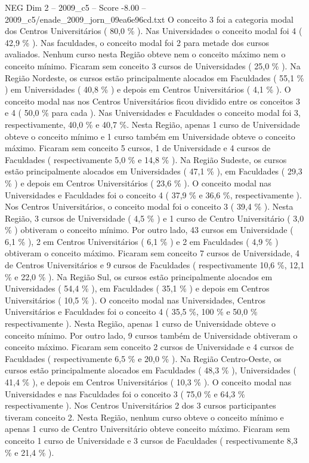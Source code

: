 \begin{textsample}{NEG Dim 2 – 2009\_c5 – Score -8.00 – 2009\_c5/enade\_2009\_jorn\_09ea6e96cd.txt}
O conceito 3 foi a categoria modal dos Centros Universitários ( 80,0 \% ).
Nas Universidades o conceito modal foi 4 ( 42,9 \% ).
Nas faculdades, o conceito modal foi 2 para metade dos cursos avaliados.
Nenhum curso nesta Região obteve nem o conceito máximo nem o conceito mínimo.
Ficaram sem conceito 3 cursos de Universidades ( 25,0 \% ).
Na Região Nordeste, os cursos estão principalmente alocados em Faculdades ( 55,1 \% ) em Universidades ( 40,8 \% ) e depois em Centros Universitários ( 4,1 \% ).
O conceito modal nas nos Centros Universitários ficou dividido entre os conceitos 3 e 4 ( 50,0 \% para cada ).
Nas Universidades e Faculdades o conceito modal foi 3, respectivamente, 40,0 \% e 40,7 \%.
Nesta Região, apenas 1 curso de Universidade obteve o conceito mínimo e 1 curso também em Universidade obteve o conceito máximo.
Ficaram sem conceito 5 cursos, 1 de Universidade e 4 cursos de Faculdades ( respectivamente 5,0 \% e 14,8 \% ).
Na Região Sudeste, os cursos estão principalmente alocados em Universidades ( 47,1 \% ), em Faculdades ( 29,3 \% ) e depois em Centros Universitários ( 23,6 \% ).
O conceito modal nas Universidades e Faculdades foi o conceito 4 ( 37,9 \% e 36,6 \%, respectivamente ).
Nos Centros Universitários, o conceito modal foi o conceito 3 ( 39,4 \% ).
Nesta Região, 3 cursos de Universidade ( 4,5 \% ) e 1 curso de Centro Universitário ( 3,0 \% ) obtiveram o conceito mínimo.
Por outro lado, 43 cursos em Universidade ( 6,1 \% ), 2 em Centros Universitários ( 6,1 \% ) e 2 em Faculdades ( 4,9 \% ) obtiveram o conceito máximo.
Ficaram sem conceito 7 cursos de Universidade, 4 de Centros Universitários e 9 cursos de Faculdades ( respectivamente 10,6 \%, 12,1 \% e 22,0 \% ).
Na Região Sul, os cursos estão principalmente alocados em Universidades ( 54,4 \% ), em Faculdades ( 35,1 \% ) e depois em Centros Universitários ( 10,5 \% ).
O conceito modal nas Universidades, Centros Universitários e Faculdades foi o conceito 4 ( 35,5 \%, 100 \% e 50,0 \% respectivamente ).
Nesta Região, apenas 1 curso de Universidade obteve o conceito mínimo.
Por outro lado, 9 cursos também de Universidade obtiveram o conceito máximo.
Ficaram sem conceito 2 cursos de Universidade e 4 cursos de Faculdades ( respectivamente 6,5 \% e 20,0 \% ).
Na Região Centro-Oeste, os cursos estão principalmente alocados em Faculdades ( 48,3 \% ), Universidades ( 41,4 \% ), e depois em Centros Universitários ( 10,3 \% ).
O conceito modal nas Universidades e nas Faculdades foi o conceito 3 ( 75,0 \% e 64,3 \% respectivamente ).
Nos Centros Universitários 2 dos 3 cursos participantes tiveram conceito 2.
Nesta Região, nenhum curso obteve o conceito mínimo e apenas 1 curso de Centro Universitário obteve conceito máximo.
Ficaram sem conceito 1 curso de Universidade e 3 cursos de Faculdades ( respectivamente 8,3 \% e 21,4 \% ).

\end{textsample}
